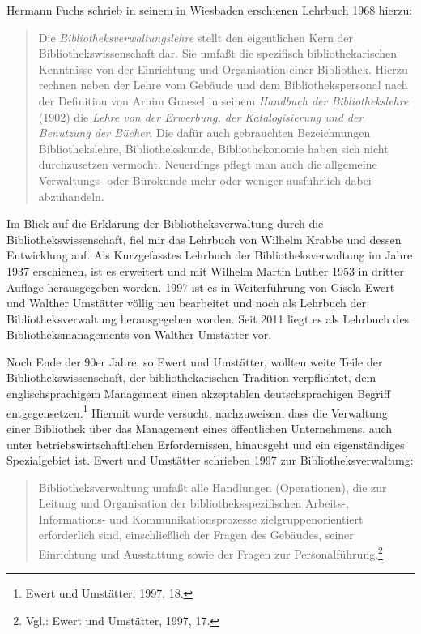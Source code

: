 \documentclass[a4paper,
fontsize=11pt,
oneside,
numbers=noperiodatend,
parskip=half-,
bibliography=totoc,
final
]{scrartcl}
\begin{document}
Hermann Fuchs schrieb in seinem in Wiesbaden erschienen Lehrbuch 1968
hierzu:

\begin{quote}
Die \emph{Bibliotheksverwaltungslehre} stellt den eigentlichen Kern der
Bibliothekswissenschaft dar. Sie umfaßt die spezifisch
bibliothekarischen Kenntnisse von der Einrichtung und Organisation einer
Bibliothek. Hierzu rechnen neben der Lehre vom Gebäude und dem
Bibliothekspersonal nach der Definition von Arnim Graesel in seinem
\emph{Handbuch der Bibliothekslehre} (1902) die \emph{Lehre von der
Erwerbung, der Katalogisierung und der Benutzung der Bücher}. Die dafür
auch gebrauchten Bezeichnungen Bibliothekslehre, Bibliothekskunde,
Bibliothekonomie haben sich nicht durchzusetzen vermocht. Neuerdings
pflegt man auch die allgemeine Verwaltungs- oder Bürokunde mehr oder
weniger ausführlich dabei abzuhandeln.
\end{quote}

Im Blick auf die Erklärung der Bibliotheksverwaltung durch die
Bibliothekswissenschaft, fiel mir das Lehrbuch von Wilhelm Krabbe und
dessen Entwicklung auf. Als Kurzgefasstes Lehrbuch der
Bibliotheksverwaltung im Jahre 1937 erschienen, ist es erweitert und mit
Wilhelm Martin Luther 1953 in dritter Auflage herausgegeben worden. 1997
ist es in Weiterführung von Gisela Ewert und Walther Umstätter völlig
neu bearbeitet und noch als Lehrbuch der Bibliotheksverwaltung
herausgegeben worden. Seit 2011 liegt es als Lehrbuch des
Bibliotheksmanagements von Walther Umstätter vor.

Noch Ende der 90er Jahre, so Ewert und Umstätter, wollten weite Teile
der Bibliothekswissenschaft, der bibliothekarischen Tradition
verpflichtet, dem englischsprachigem Management einen akzeptablen
deutschsprachigen Begriff entgegensetzen.\footnote{Ewert und Umstätter,
  1997, 18.} Hiermit wurde versucht, nachzuweisen, dass die Verwaltung
einer Bibliothek über das Management eines öffentlichen Unternehmens,
auch unter betriebswirtschaftlichen Erfordernissen, hinausgeht und ein
eigenständiges Spezialgebiet ist. Ewert und Umstätter schrieben 1997 zur
Bibliotheksverwaltung:

\begin{quote}
Bibliotheksverwaltung umfaßt alle Handlungen (Operationen), die zur
Leitung und Organisation der bibliotheksspezifischen Arbeits-,
Informations- und Kommunikationsprozesse zielgruppenorientiert
erforderlich sind, einschließlich der Fragen des Gebäudes, seiner
Einrichtung und Ausstattung sowie der Fragen zur
Personalführung.\footnote{Vgl.: Ewert und Umstätter, 1997, 17.}
\end{quote}
\end{document}
